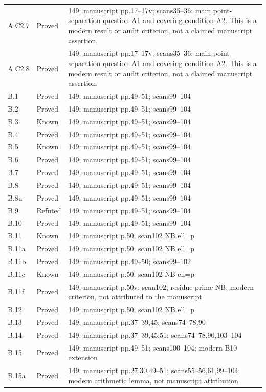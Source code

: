 {\begin{longtable}{p{1.9cm}p{1.7cm}p{10.3cm}}
A.C2.7 & Proved & 149; manuscript pp.17–17v; scans35–36: main point-separation question A1 and covering condition A2. This is a modern result or audit criterion, not a claimed manuscript assertion. \\
A.C2.8 & Proved & 149; manuscript pp.17–17v; scans35–36: main point-separation question A1 and covering condition A2. This is a modern result or audit criterion, not a claimed manuscript assertion. \\
B.1 & Proved & 149; manuscript pp.49–51; scans99–104 \\
B.2 & Proved & 149; manuscript pp.49–51; scans99–104 \\
B.3 & Known & 149; manuscript pp.49–51; scans99–104 \\
B.4 & Proved & 149; manuscript pp.49–51; scans99–104 \\
B.5 & Known & 149; manuscript pp.49–51; scans99–104 \\
B.6 & Proved & 149; manuscript pp.49–51; scans99–104 \\
B.7 & Proved & 149; manuscript pp.49–51; scans99–104 \\
B.8 & Proved & 149; manuscript pp.49–51; scans99–104 \\
B.8u & Proved & 149; manuscript pp.49–51; scans99–104 \\
B.9 & Refuted & 149; manuscript pp.49–51; scans99–104 \\
B.10 & Proved & 149; manuscript pp.49–51; scans99–104 \\
B.11 & Known & 149; manuscript p.50; scan102 NB ell=p \\
B.11a & Proved & 149; manuscript p.50; scan102 NB ell=p \\
B.11b & Proved & 149; manuscript pp.49–50; scans99–102 \\
B.11c & Known & 149; manuscript p.50; scan102 NB ell=p \\
B.11f & Proved & 149; manuscript p.50v; scan102, residue-prime NB; modern criterion, not attributed to the manuscript \\
B.12 & Proved & 149; manuscript p.50; scan102 NB ell=p \\
B.13 & Proved & 149; manuscript pp.37–39,45; scans74–78,90 \\
B.14 & Proved & 149; manuscript pp.37–39,45,51; scans74–78,90,103–104 \\
B.15 & Proved & 149; manuscript pp.49–51; scans100–104; modern B10 extension \\
B.15a & Proved & 149; manuscript pp.27,30,49–51; scans55–56,61,99–104; modern arithmetic lemma, not manuscript attribution \\

\end{longtable}}
